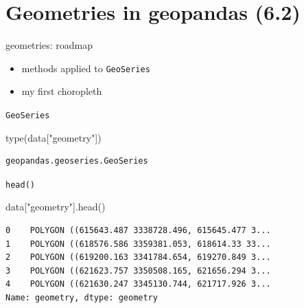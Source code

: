 \documentclass[
  ignorenonframetext,
]{beamer}
\newenvironment{Shaded}{\begin{snugshade}}{\end{snugshade}}
\newcommand{\BuiltInTok}[1]{\textcolor[rgb]{0.00,0.23,0.31}{#1}}
\newcommand{\NormalTok}[1]{\textcolor[rgb]{0.00,0.23,0.31}{#1}}
\newcommand{\StringTok}[1]{\textcolor[rgb]{0.13,0.47,0.30}{#1}}
\providecommand{\tightlist}{%
  \setlength{\itemsep}{0pt}\setlength{\parskip}{0pt}}\usepackage{longtable,booktabs,array}
\begin{document}
\section{Geometries in geopandas
(6.2)}\label{geometries-in-geopandas-6.2}

\begin{frame}[fragile]{geometries: roadmap}
\label{geometries-roadmap}
\begin{itemize}
\tightlist
\item
  methods applied to \texttt{GeoSeries}
\item
  my first choropleth
\end{itemize}
\end{frame}

\begin{frame}[fragile]{\texttt{GeoSeries}}
\label{geoseries}
\begin{Shaded}
\begin{Highlighting}[]
\BuiltInTok{type}\NormalTok{(data[}\StringTok{"geometry"}\NormalTok{])}
\end{Highlighting}
\end{Shaded}

\begin{verbatim}
geopandas.geoseries.GeoSeries
\end{verbatim}
\end{frame}

\begin{frame}[fragile]{\texttt{head()}}
\label{head}
\scriptsize

\begin{Shaded}
\begin{Highlighting}[]
\NormalTok{data[}\StringTok{"geometry"}\NormalTok{].head()}
\end{Highlighting}
\end{Shaded}

\begin{verbatim}
0    POLYGON ((615643.487 3338728.496, 615645.477 3...
1    POLYGON ((618576.586 3359381.053, 618614.33 33...
2    POLYGON ((619200.163 3341784.654, 619270.849 3...
3    POLYGON ((621623.757 3350508.165, 621656.294 3...
4    POLYGON ((621630.247 3345130.744, 621717.926 3...
Name: geometry, dtype: geometry
\end{verbatim}

\normalsize
\end{frame}
\end{document}
